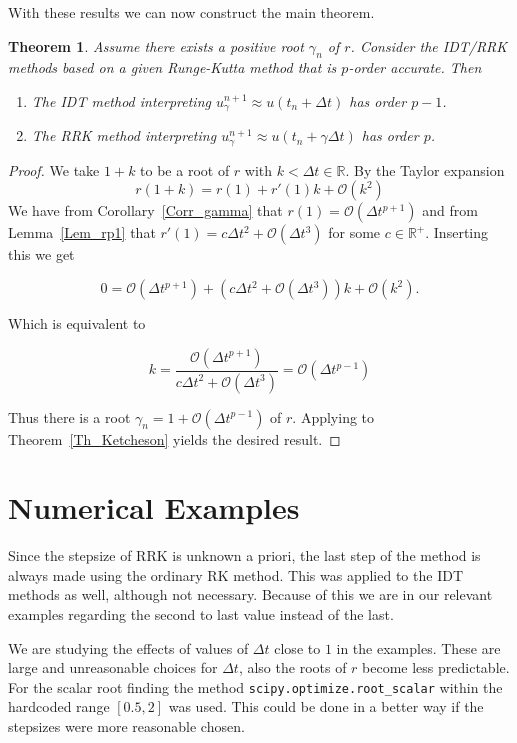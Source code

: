 \documentclass{article}
\newtheorem{theorem}{Theorem}[section]
\begin{document}
    With these results we can now construct the main theorem.
    \begin{theorem}\label{Th_main}
        Assume there exists a positive root \(\gamma_n\) of \(r\). Consider the IDT/RRK methods based on a given Runge-Kutta method that is \(p\)-order accurate. Then
        \begin{enumerate}
            \item The IDT method interpreting \(u_{\gamma}^{n+1} \approx u(t_n + \Delta t)\) has order \(p-1\).
            \item The RRK method interpreting \(u_{\gamma}^{n+1} \approx u(t_n + \gamma \Delta t)\) has order \(p\).
        \end{enumerate}
    \end{theorem}
    \begin{proof}
        We take \(1+k\) to be a root of \(r\) with \(k<\Delta t \in \mathbb{R}\). By the Taylor expansion
        \[r(1+k) = r(1) + r'(1)k + \mathcal{O}(k^2)\]
        We have from Corollary~\ref{Corr_gamma} that \(r(1) = \mathcal{O}(\Delta t^{p+1})\) and from Lemma~\ref{Lem_rp1} that \(r'(1)=c\Delta t^2 + \mathcal{O}(\Delta t^{3})\) for some \(c \in \mathbb{R^+}\). Inserting this we get

        \[0 = \mathcal{O}(\Delta t^{p+1}) + (c\Delta t^2 + \mathcal{O}(\Delta t^{3})) k + \mathcal{O}(k^2).\]

        Which is equivalent to

        \[k = \frac{\mathcal{O}(\Delta t^{p+1})}{c\Delta t^2 + \mathcal{O}(\Delta t^{3})} = \mathcal{O}(\Delta t^{p-1})\]

        Thus there is a root \(\gamma_n = 1 + \mathcal{O}(\Delta t^{p-1})\) of \(r\). Applying to Theorem~\ref{Th_Ketcheson} yields the desired result.
    \end{proof}


\section{Numerical Examples}

    Since the stepsize of RRK is unknown a priori, the last step of the method is always made using the ordinary RK method. This was applied to the IDT methods as well, although not necessary.
    Because of this we are in our relevant examples regarding the second to last value instead of the last.

    \vspace*{5mm}
    We are studying the effects of values of \(\Delta t\) close to \(1\) in the examples. These are large and unreasonable choices for \(\Delta t\), also the roots of \(r\) become less predictable. For the scalar root finding the method \texttt{scipy.optimize.root\_scalar} within the hardcoded range \( \left[0.5,2\right] \) was used. This could be done in a better way if the stepsizes were more reasonable chosen.
\end{document}
